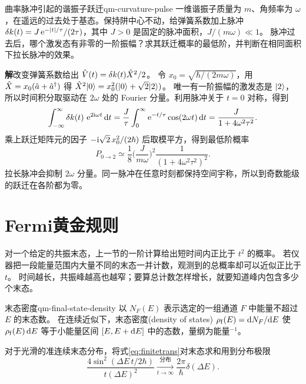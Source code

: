 \begin{example}{曲率脉冲引起的谐振子跃迁}{qm-curvature-pulse}
    一维谐振子质量为 $m$、角频率为 $\omega$，在遥远的过去处于基态。保持阱中心不动，给弹簧系数加上脉冲
    $\delta k(t) = J\mathop{}\!\mathrm{e}^{-\lvert t\rvert/\tau}/(2\tau)$，其中 $J > 0$ 是固定的脉冲面积，$J/(m\omega) \ll 1$。
    脉冲过去后，哪个激发态有非零的一阶振幅？求其跃迁概率的最低阶，并判断在相同面积下拉长脉冲的效果。

    \par\smallskip\textbf{解}\quad 改变弹簧系数给出 $\hat{V}(t) = \delta k(t)\hat{X}^2/2$。
    令 $x_0 = \sqrt{\hbar/(2m\omega)}$，用 $\hat{X} = x_0(\hat{a} + \hat{a}^\dagger)$ 得
    $\hat{X}^2\lvert0\rangle = x_0^2(\lvert0\rangle + \sqrt2\lvert2\rangle)$。
    唯一有一阶振幅的激发态是 $\lvert2\rangle$，所以时间积分取驱动在 $2\omega$ 处的 Fourier 分量。利用脉冲关于 $t=0$ 对称，得到
    \[
        \int_{-\infty}^\infty \delta k(t)\,\mathop{}\!\mathrm{e}^{2\mathrm{i}\omega t}\mathop{}\!\mathrm{d} t
        = \frac{J}{\tau}\int_0^\infty \mathop{}\!\mathrm{e}^{-t/\tau}\cos(2\omega t)\mathop{}\!\mathrm{d} t
        = \frac{J}{1 + 4\omega^2\tau^2}.
    \]
    乘上跃迁矩阵元的因子 $-\mathrm{i}\sqrt2\,x_0^2/(2\hbar)$ 后取模平方，得到最低阶概率
    \[
        P_{0\to2} \simeq \frac{1}{8}\bigg(\frac{J}{m\omega}\bigg)^2
        \frac{1}{(1 + 4\omega^2\tau^2)^2}.
    \]
    拉长脉冲会抑制 $2\omega$ 分量。同一脉冲在任意时刻都保持空间宇称，所以到奇数能级的跃迁在各阶都为零。
\end{example}

\section{Fermi黄金规则}
对一个给定的共振末态，上一节的一阶计算给出短时间内正比于 $t^2$ 的概率。
若仪器把一段能量范围内大量不同的末态一并计数，观测到的总概率却可以近似正比于 $t$。
时间越长，共振峰越高也越窄；要算总计数怎样增长，就要知道峰内包含多少个末态。

\begin{definition}{末态密度}{qm-final-state-density}
    以 $N_F(E)$ 表示选定的一组通道 $F$ 中能量不超过 $E$ 的末态数。
    在连续近似下，末态密度(density of states) $\rho_\mathrm f(E) = \mathop{}\!\mathrm{d} N_F/\mathrm{d} E$
    使 $\rho_\mathrm f(E)\mathop{}\!\mathrm{d} E$ 等于小能量区间 $[E,E + \mathop{}\!\mathrm{d} E]$ 中的态数，量纲为能量$^{-1}$。
\end{definition}
对于光滑的准连续末态分布，将式\eqref{eq:finitetrans}对末态求和用到分布极限
\begin{equation}
    \frac{4\sin^2(\Delta E\,t/2\hbar)}{t(\Delta E)^2}
    \xrightarrow[t\to\infty]{\text{分布}}
    \frac{2\pi}{\hbar}\delta(\Delta E).
\end{equation}

